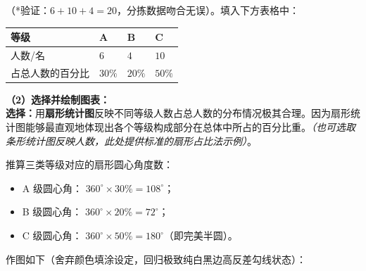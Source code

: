 \documentclass[12pt, a4paper]{ctexrep}
\begin{document}
（*验证：$6+10+4=20$，分拣数据吻合无误）。填入下方表格中：

\vspace{0.2cm}
\begin{center}
\renewcommand{\arraystretch}{1.5}
\begin{tabular}{|>{\centering\arraybackslash}p{3.4cm}|>{\centering\arraybackslash}p{3.4cm}|>{\centering\arraybackslash}p{3.4cm}|>{\centering\arraybackslash}p{3.4cm}|}
  \hline
  \cellcolor{gray!15} 等级 & A & B & C \\
  \hline
  \cellcolor{gray!15} 人数/名 & \textbf{$6$} & \textbf{$4$} & \textbf{$10$} \\
  \hline
  \cellcolor{gray!15} 占总人数的百分比 & \textbf{$30\%$} & \textbf{$20\%$} & \textbf{$50\%$} \\
  \hline
\end{tabular}
\end{center}
\vspace{0.4cm}

\textbf{（2）选择并绘制图表：} \\
\textbf{选择：}用\textbf{扇形统计图}反映不同等级人数占总人数的分布情况极其合理。因为扇形统计图能够最直观地体现出各个等级构成部分在总体中所占的百分比重。\textit{（也可选取条形统计图反映人数，此处提供标准的扇形占比法示例）}。

推算三类等级对应的扇形圆心角度数：
\begin{itemize}
  \item A 级圆心角： $360^\circ \times 30\% = 108^\circ$；
  \item B 级圆心角： $360^\circ \times 20\% = 72^\circ$；
  \item C 级圆心角： $360^\circ \times 50\% = 180^\circ$（即完美半圆）。
\end{itemize}

作图如下（舍弃颜色填涂设定，回归极致纯白黑边高反差勾线状态）：
\end{document}

